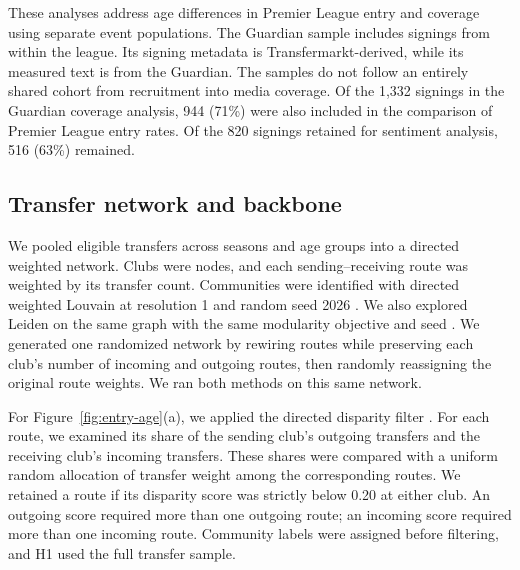 These analyses address age differences in Premier League entry and coverage using separate event populations. The Guardian sample includes signings from within the league. Its signing metadata is Transfermarkt-derived, while its measured text is from the Guardian. The samples do not follow an entirely shared cohort from recruitment into media coverage. Of the 1,332 signings in the Guardian coverage analysis, 944 (71\%) were also included in the comparison of Premier League entry rates. Of the 820 signings retained for sentiment analysis, 516 (63\%) remained.

\subsection*{Transfer network and backbone}

We pooled eligible transfers across seasons and age groups into a directed weighted network. Clubs were nodes, and each sending--receiving route was weighted by its transfer count. Communities were identified with directed weighted Louvain at resolution 1 and random seed 2026 \cite{blondel2008louvain,dugue2015directed}. We also explored Leiden on the same graph with the same modularity objective and seed \cite{traag2019leiden}. We generated one randomized network by rewiring routes while preserving each club's number of incoming and outgoing routes, then randomly reassigning the original route weights. We ran both methods on this same network.

For Figure~\ref{fig:entry-age}(a), we applied the directed disparity filter \cite{serrano2009multiscale}. For each route, we examined its share of the sending club's outgoing transfers and the receiving club's incoming transfers. These shares were compared with a uniform random allocation of transfer weight among the corresponding routes. We retained a route if its disparity score was strictly below 0.20 at either club. An outgoing score required more than one outgoing route; an incoming score required more than one incoming route. Community labels were assigned before filtering, and H1 used the full transfer sample.

